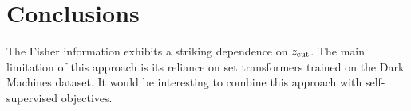\section{Conclusions}\label{sec:conclusions}

The Fisher information exhibits a striking dependence on $z_{\rm cut}$.
The main limitation of this approach is its reliance on set transformers
trained on the Dark Machines dataset. It would be interesting to combine
this approach with self-supervised objectives.

